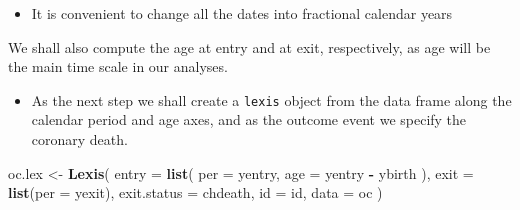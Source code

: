 \documentclass[
]{book}
\newenvironment{Shaded}{\begin{snugshade}}{\end{snugshade}}
\newcommand{\AttributeTok}[1]{\textcolor[rgb]{0.13,0.29,0.53}{#1}}
\newcommand{\FunctionTok}[1]{\textcolor[rgb]{0.13,0.29,0.53}{\textbf{#1}}}
\newcommand{\NormalTok}[1]{#1}
\newcommand{\OtherTok}[1]{\textcolor[rgb]{0.56,0.35,0.01}{#1}}
\newcommand{\SpecialCharTok}[1]{\textcolor[rgb]{0.81,0.36,0.00}{\textbf{#1}}}
\providecommand{\tightlist}{%
  \setlength{\itemsep}{0pt}\setlength{\parskip}{0pt}}
\begin{document}
\begin{itemize}
\tightlist
\item
  It is convenient to change all the dates into fractional calendar years
\end{itemize}

\begin{Shaded}
\end{Shaded}

We shall also compute the age at entry and at exit, respectively,
as age will be the main time scale in our analyses.

\begin{Shaded}
\end{Shaded}

\begin{itemize}
\tightlist
\item
  As the next step we shall create a \texttt{lexis} object
  from the data frame along the calendar period and age axes,
  and as the outcome event we specify the coronary death.
\end{itemize}

\begin{Shaded}
\begin{Highlighting}[]
\NormalTok{oc.lex }\OtherTok{\textless{}{-}} \FunctionTok{Lexis}\NormalTok{(}
  \AttributeTok{entry =} \FunctionTok{list}\NormalTok{(}
    \AttributeTok{per =}\NormalTok{ yentry,}
    \AttributeTok{age =}\NormalTok{ yentry }\SpecialCharTok{{-}}\NormalTok{ ybirth}
\NormalTok{  ),}
  \AttributeTok{exit =} \FunctionTok{list}\NormalTok{(}\AttributeTok{per =}\NormalTok{ yexit),}
  \AttributeTok{exit.status =}\NormalTok{ chdeath,}
  \AttributeTok{id =}\NormalTok{ id, }\AttributeTok{data =}\NormalTok{ oc}
\NormalTok{)}
\end{Highlighting}
\end{Shaded}
\end{document}
